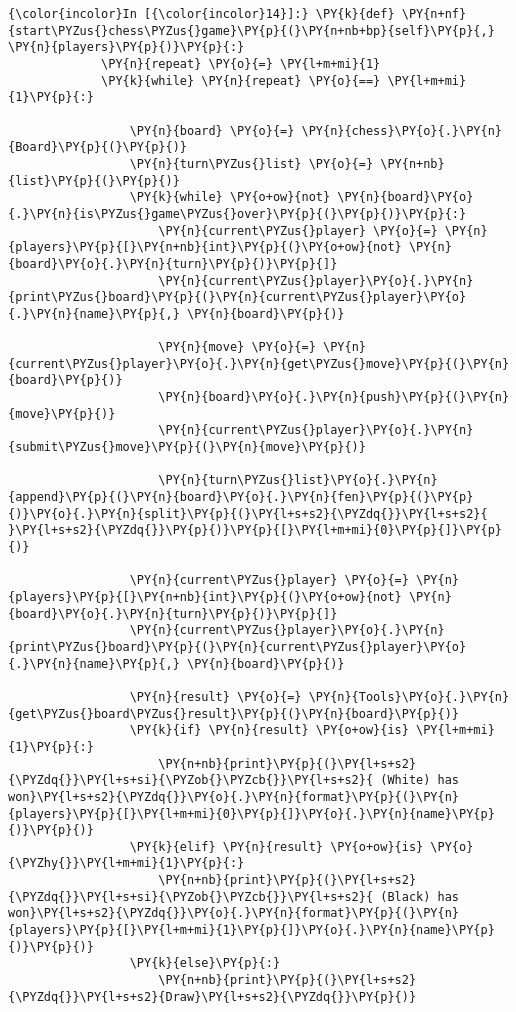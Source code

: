     \begin{Verbatim}[commandchars=\\\{\}]
{\color{incolor}In [{\color{incolor}14}]:} \PY{k}{def} \PY{n+nf}{start\PYZus{}chess\PYZus{}game}\PY{p}{(}\PY{n+nb+bp}{self}\PY{p}{,} \PY{n}{players}\PY{p}{)}\PY{p}{:}
             \PY{n}{repeat} \PY{o}{=} \PY{l+m+mi}{1}
             \PY{k}{while} \PY{n}{repeat} \PY{o}{==} \PY{l+m+mi}{1}\PY{p}{:}
         
                 \PY{n}{board} \PY{o}{=} \PY{n}{chess}\PY{o}{.}\PY{n}{Board}\PY{p}{(}\PY{p}{)}
                 \PY{n}{turn\PYZus{}list} \PY{o}{=} \PY{n+nb}{list}\PY{p}{(}\PY{p}{)}
                 \PY{k}{while} \PY{o+ow}{not} \PY{n}{board}\PY{o}{.}\PY{n}{is\PYZus{}game\PYZus{}over}\PY{p}{(}\PY{p}{)}\PY{p}{:}
                     \PY{n}{current\PYZus{}player} \PY{o}{=} \PY{n}{players}\PY{p}{[}\PY{n+nb}{int}\PY{p}{(}\PY{o+ow}{not} \PY{n}{board}\PY{o}{.}\PY{n}{turn}\PY{p}{)}\PY{p}{]}
                     \PY{n}{current\PYZus{}player}\PY{o}{.}\PY{n}{print\PYZus{}board}\PY{p}{(}\PY{n}{current\PYZus{}player}\PY{o}{.}\PY{n}{name}\PY{p}{,} \PY{n}{board}\PY{p}{)}
         
                     \PY{n}{move} \PY{o}{=} \PY{n}{current\PYZus{}player}\PY{o}{.}\PY{n}{get\PYZus{}move}\PY{p}{(}\PY{n}{board}\PY{p}{)}
                     \PY{n}{board}\PY{o}{.}\PY{n}{push}\PY{p}{(}\PY{n}{move}\PY{p}{)}
                     \PY{n}{current\PYZus{}player}\PY{o}{.}\PY{n}{submit\PYZus{}move}\PY{p}{(}\PY{n}{move}\PY{p}{)}
         
                     \PY{n}{turn\PYZus{}list}\PY{o}{.}\PY{n}{append}\PY{p}{(}\PY{n}{board}\PY{o}{.}\PY{n}{fen}\PY{p}{(}\PY{p}{)}\PY{o}{.}\PY{n}{split}\PY{p}{(}\PY{l+s+s2}{\PYZdq{}}\PY{l+s+s2}{ }\PY{l+s+s2}{\PYZdq{}}\PY{p}{)}\PY{p}{[}\PY{l+m+mi}{0}\PY{p}{]}\PY{p}{)}
         
                 \PY{n}{current\PYZus{}player} \PY{o}{=} \PY{n}{players}\PY{p}{[}\PY{n+nb}{int}\PY{p}{(}\PY{o+ow}{not} \PY{n}{board}\PY{o}{.}\PY{n}{turn}\PY{p}{)}\PY{p}{]}
                 \PY{n}{current\PYZus{}player}\PY{o}{.}\PY{n}{print\PYZus{}board}\PY{p}{(}\PY{n}{current\PYZus{}player}\PY{o}{.}\PY{n}{name}\PY{p}{,} \PY{n}{board}\PY{p}{)}
         
                 \PY{n}{result} \PY{o}{=} \PY{n}{Tools}\PY{o}{.}\PY{n}{get\PYZus{}board\PYZus{}result}\PY{p}{(}\PY{n}{board}\PY{p}{)}
                 \PY{k}{if} \PY{n}{result} \PY{o+ow}{is} \PY{l+m+mi}{1}\PY{p}{:}
                     \PY{n+nb}{print}\PY{p}{(}\PY{l+s+s2}{\PYZdq{}}\PY{l+s+si}{\PYZob{}\PYZcb{}}\PY{l+s+s2}{ (White) has won}\PY{l+s+s2}{\PYZdq{}}\PY{o}{.}\PY{n}{format}\PY{p}{(}\PY{n}{players}\PY{p}{[}\PY{l+m+mi}{0}\PY{p}{]}\PY{o}{.}\PY{n}{name}\PY{p}{)}\PY{p}{)}
                 \PY{k}{elif} \PY{n}{result} \PY{o+ow}{is} \PY{o}{\PYZhy{}}\PY{l+m+mi}{1}\PY{p}{:}
                     \PY{n+nb}{print}\PY{p}{(}\PY{l+s+s2}{\PYZdq{}}\PY{l+s+si}{\PYZob{}\PYZcb{}}\PY{l+s+s2}{ (Black) has won}\PY{l+s+s2}{\PYZdq{}}\PY{o}{.}\PY{n}{format}\PY{p}{(}\PY{n}{players}\PY{p}{[}\PY{l+m+mi}{1}\PY{p}{]}\PY{o}{.}\PY{n}{name}\PY{p}{)}\PY{p}{)}
                 \PY{k}{else}\PY{p}{:}
                     \PY{n+nb}{print}\PY{p}{(}\PY{l+s+s2}{\PYZdq{}}\PY{l+s+s2}{Draw}\PY{l+s+s2}{\PYZdq{}}\PY{p}{)}
         

\end{Verbatim}
